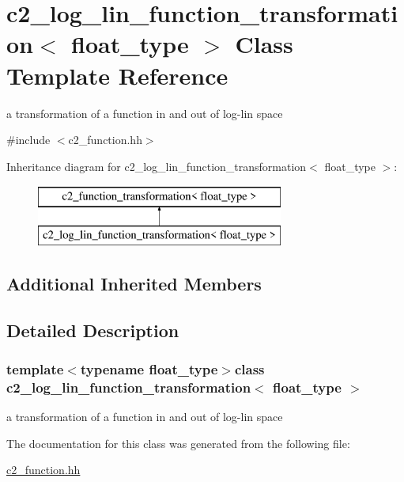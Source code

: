 \hypertarget{classc2__log__lin__function__transformation}{\section{c2\-\_\-log\-\_\-lin\-\_\-function\-\_\-transformation$<$ float\-\_\-type $>$ Class Template Reference}
\label{classc2__log__lin__function__transformation}
}


a transformation of a function in and out of log-\/lin space  




{\ttfamily \#include $<$c2\-\_\-function.\-hh$>$}

Inheritance diagram for c2\-\_\-log\-\_\-lin\-\_\-function\-\_\-transformation$<$ float\-\_\-type $>$\-:\begin{figure}[H]
\begin{center}
\leavevmode
\includegraphics[height=2.000000cm]{classc2__log__lin__function__transformation}
\end{center}
\end{figure}
\subsection*{Additional Inherited Members}


\subsection{Detailed Description}
\subsubsection*{template$<$typename float\-\_\-type$>$class c2\-\_\-log\-\_\-lin\-\_\-function\-\_\-transformation$<$ float\-\_\-type $>$}

a transformation of a function in and out of log-\/lin space 



The documentation for this class was generated from the following file\-:\begin{DoxyCompactItemize}
\item 
\hyperlink{c2__function_8hh}{c2\-\_\-function.\-hh}\end{DoxyCompactItemize}
